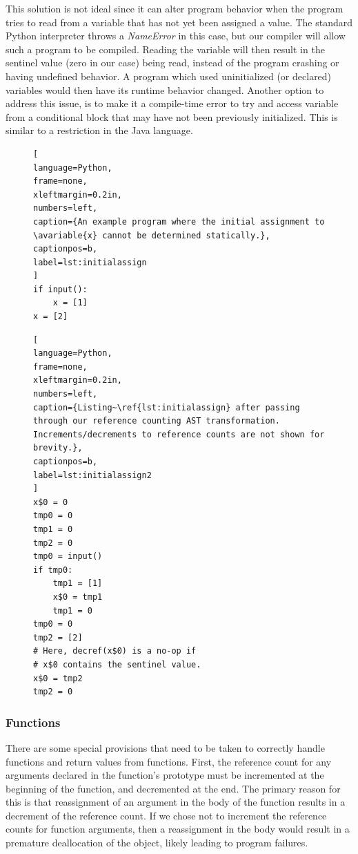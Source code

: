 \documentclass{sigplanconf}
\newcommand{\avariable}[1]{\ensuremath{#1}}
\begin{document}
This solution is not ideal since it can alter program behavior when the program tries to read from a variable that has not yet been assigned a value.  The standard Python interpreter throws a \textit{NameError} in this case, but our compiler will allow such a program to be compiled.  Reading the variable will then result in the sentinel value (zero in our case) being read, instead of the program crashing or having undefined behavior.  A program which used uninitialized (or declared) variables would then have its runtime behavior changed.  Another option to address this issue, is to make it a compile-time error to try and access variable from a conditional block that may have not been previously initialized.  This is similar to a restriction in the Java language.

\begin{figure}[h]
\begin{lstlisting}[
language=Python,
frame=none,
xleftmargin=0.2in,
numbers=left,
caption={An example program where the initial assignment to \avariable{x} cannot be determined statically.},
captionpos=b,
label=lst:initialassign
]
if input():
    x = [1]
x = [2]
\end{lstlisting}
\end{figure}

\begin{figure}[h]
\begin{lstlisting}[
language=Python,
frame=none,
xleftmargin=0.2in,
numbers=left,
caption={Listing~\ref{lst:initialassign} after passing through our reference counting AST transformation. Increments/decrements to reference counts are not shown for brevity.},
captionpos=b,
label=lst:initialassign2
]
x$0 = 0
tmp0 = 0
tmp1 = 0
tmp2 = 0
tmp0 = input()
if tmp0:
    tmp1 = [1]
    x$0 = tmp1
    tmp1 = 0
tmp0 = 0
tmp2 = [2]
# Here, decref(x$0) is a no-op if 
# x$0 contains the sentinel value.
x$0 = tmp2 
tmp2 = 0
\end{lstlisting}
\end{figure}


\subsubsection{Functions}
There are some special provisions that need to be taken to correctly handle functions and return values from functions.  First, the reference count for any arguments declared in the function's prototype must be incremented at the beginning of the function, and decremented at the end.  The primary reason for this is that reassignment of an argument in the body of the function results in a decrement of the reference count.  If we chose not to increment the reference counts for function arguments, then a reassignment in the body would result in a premature deallocation of the object, likely leading to program failures.
\end{document}
